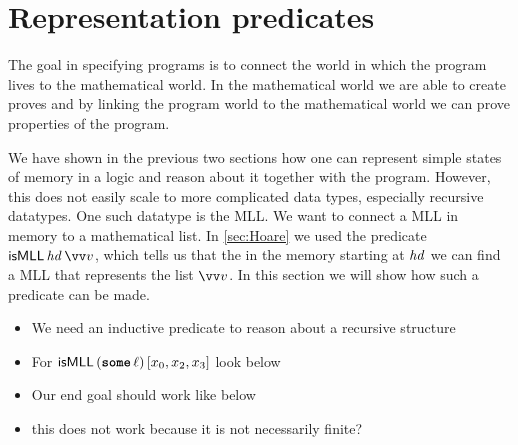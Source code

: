 \documentclass[thesis.tex]{subfiles}
\begin{document}
\section{Representation predicates}
\label{sec:represpreds}
The goal in specifying programs is to connect the world in which the program lives to the mathematical world. In the mathematical world we are able to create proves and by linking the program world to the mathematical world we can prove properties of the program. 

We have shown in the previous two sections how one can represent simple states of memory in a logic and reason about it together with the program. However, this does not easily scale to more complicated data types, especially recursive datatypes. One such datatype is the MLL. We want to connect a MLL in memory to a mathematical list. In \cref*{sec:Hoare} we used the predicate $\textlog{isMLL}\, \langv{hd}\, \vect{v}$, which tells us that the in the memory starting at $\mathit{hd}$ we can find a MLL that represents the list $\vect{v}$. In this section we will show how such a predicate can be made.

\begin{itemize}
  \item We need an inductive predicate to reason about a recursive structure
  \item For $\textsf{\upshape isMLL}\,(\operatorname{\texttt{\bfseries some}}\ell)\,[x_0,x_2,x_3]$ look below
\end{itemize}
\begin{center}
\end{center}
\begin{itemize}
  \item Our end goal should work like below
  \item this does not work because it is not necessarily finite? 
\end{itemize}
\end{document}
